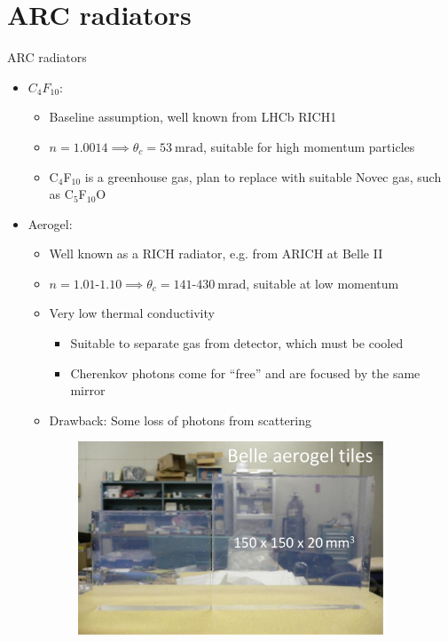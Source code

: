 \documentclass{beamer}
\begin{document}
\section{ARC radiators}
\begin{frame}{ARC radiators}
  \begin{itemize}
    \setlength\itemsep{0.1em}
    \item{$C_4F_{10}$:}
    \begin{itemize}
      \setlength\itemsep{0.2em}
      \item{Baseline assumption, well known from LHCb RICH1}
      \item{$n = 1.0014\implies\theta_c = \SI{53}{\milli\radian}$, suitable for high momentum particles}
      \item{C$_4$F$_{10}$ is a greenhouse gas, plan to replace with suitable Novec gas, such as C$_5$F$_{10}$O}
    \end{itemize}
    \item{Aerogel:}
    \begin{itemize}
      \setlength\itemsep{0.2em}
      \item{Well known as a RICH radiator, e.g. from ARICH at Belle II}
      \item{$n = 1.01$-$1.10\implies\theta_c = 141$-$\SI{430}{\milli\radian}$, suitable at low momentum}
      \item{Very low thermal conductivity}
      \begin{itemize}
        \item{Suitable to separate gas from detector, which must be cooled}
        \item{Cherenkov photons come for ``free'' and are focused by the same mirror}
      \end{itemize}
      \item{Drawback: Some loss of photons from scattering}
    \end{itemize}
  \end{itemize}
  \begin{figure}
    \centering
    \begin{subfigure}{0.25\textwidth}
      \includegraphics[width = 1.0\textwidth]{Plots/BelleAerogelTiles.png}

\end{subfigure}
\end{figure}
\end{frame}
\end{document}
